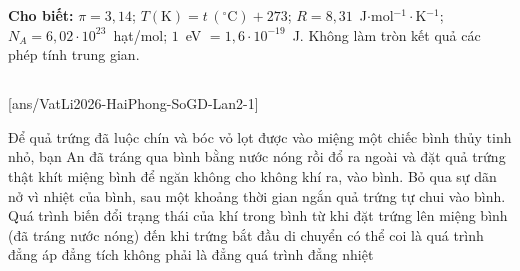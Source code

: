 \newcommand{\HPhaimaytich}[3]{%
	\foreach \x/\y/\r in {#3}{\fill[white,path fading=HPhaimo,opacity=0.5] (\x,\y) circle (1.5*\r);}%
	\begin{scope}
		\clip foreach \x/\y/\r in {#3}{(\x,\y) circle (1.06*\r)};
		\fill[white] (-20,{#1-12}) rectangle (270,{#2+12});
		\foreach \x/\y/\r in {#3}{\pgfmathsetmacro{\HPhaiop}{(\r>5.9)*0.3}\fill[gray!22!HPhaitroi!35!white,path fading=HPhaimo,opacity=\HPhaiop] (\x+0.35*\r,\y+0.6*\r) ellipse[x radius=0.9*\r,y radius=0.5*\r];}%
		\fill[gray!35!HPhaitroi!48!white,path fading=north] (-20,{#1+0.5*(#2-#1)}) rectangle (270,{#2+1});
	\end{scope}}


	\noindent\textbf{Cho biết:} $\pi=3{,}14$; $T(\text{K})=t\,(^\circ\text{C})+273$; $R=8{,}31$~J$\cdot$mol$^{-1}\cdot$K$^{-1}$; $N_A=6{,}02\cdot 10^{23}$~hạt/mol; $1$~eV $=1{,}6\cdot 10^{-19}$~J. Không làm tròn kết quả các phép tính trung gian.

	\noindent
	\subsection*{}
	\setcounter{ex}{0}
	[ans/VatLi2026-HaiPhong-SoGD-Lan2-1]

	\begin{ex}%
		Để quả trứng đã luộc chín và bóc vỏ lọt được vào miệng một chiếc bình thủy tinh nhỏ, bạn An đã tráng qua bình bằng nước nóng rồi đổ ra ngoài và đặt quả trứng thật khít miệng bình để ngăn không cho không khí ra, vào bình. Bỏ qua sự dãn nở vì nhiệt của bình, sau một khoảng thời gian ngắn quả trứng tự chui vào bình. Quá trình biến đổi trạng thái của khí trong bình từ khi đặt trứng lên miệng bình (đã tráng nước nóng) đến khi trứng bắt đầu di chuyển có thể coi là quá trình
		\choice
		{đẳng áp}
		{\True đẳng tích}
		{không phải là đẳng quá trình}
		{đẳng nhiệt}
	\end{ex}

